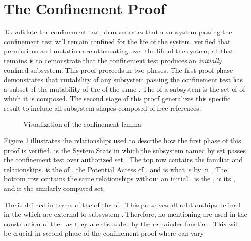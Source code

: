 \section{The Confinement Proof}

To validate the confinement test, \TMmodelName{} demonstrates that a subsystem passing the confinement test will remain confined for the life of the system.
 verified that permissions and mutation are attenuating over the life of the system; all that remains is to demonstrate that the confinement test produces an \emph{initially} confined subsystem.
This proof proceeds in two phases.
The first proof phase demonstrates that mutability of any subsystem passing the confinement test has a subset of the mutability of the  of the same .
The  of a subsystem is the set of \TMrefs{} of which it is composed.
The second stage of this proof generalizes this specific result to include all subsystem shapes composed of free references.

\begin{figure}
  \centering
  \FIGconfinementLemmaCOQ{}
  \caption{Visualization of the confinement lemma \label{fig:confinement:confinement-lemma}}
\end{figure}

Figure \ref{fig:confinement:confinement-lemma} illustrates the relationships used to describe how the first phase of this proof is verified.
 is the System State in which the subsystem named by set  passes the confinement test over authorized set .
The top row contains the familiar \TMdirAcc{} and \TMpotAcc{} relationships.
 is the \TMdirAccAG{} of ,  the Potential Access of , and  is what is \TMmutable{} by  in .
The bottom row contains the same relationships without an initial \TMsystemState{}.
 is the \TMagFullyAuthorized{},  is its \TMpotAcc{}, and  is the similarly computed \TMmutable{} set.

The \TMagFullyAuthorized{} is defined in terms of the \TMdirAccAG{} of the \TMsystemState{} of \TMsubsystem{} .
This preserves all relationships defined in the \TMsystemState{} which are external to subsystem .
Therefore, no \TMaccessEdges{} mentioning \TMsubsystem{}  are used in the construction of the \TMagFullyAuthorized{}, as they are discarded by the remainder function.
This will be crucial in second phase of the confinement proof where \TMsubsystem{}  can vary.


